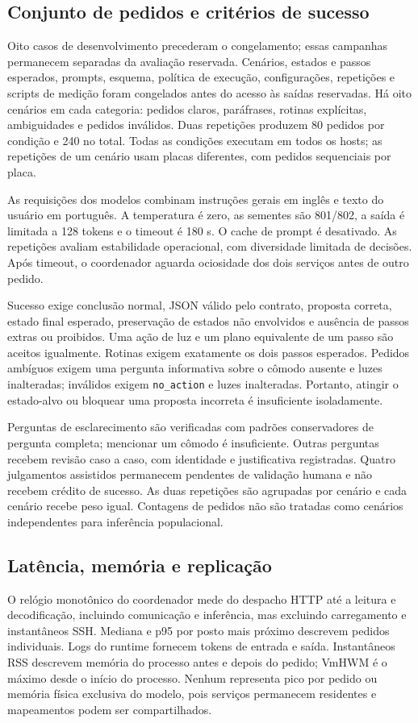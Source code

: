 \documentclass[letterpaper,conference]{IEEEtran}
\begin{document}
\subsection{Conjunto de pedidos e critérios de sucesso}
Oito casos de desenvolvimento precederam o congelamento; essas campanhas permanecem separadas da avaliação reservada. Cenários, estados e passos esperados, prompts, esquema, política de execução, configurações, repetições e scripts de medição foram congelados antes do acesso às saídas reservadas. Há oito cenários em cada categoria: pedidos claros, paráfrases, rotinas explícitas, ambiguidades e pedidos inválidos. Duas repetições produzem 80 pedidos por condição e 240 no total. Todas as condições executam em todos os hosts; as repetições de um cenário usam placas diferentes, com pedidos sequenciais por placa.

As requisições dos modelos combinam instruções gerais em inglês e texto do usuário em português. A temperatura é zero, as sementes são 801/802, a saída é limitada a 128 tokens e o timeout é 180 s. O cache de prompt é desativado. As repetições avaliam estabilidade operacional, com diversidade limitada de decisões. Após timeout, o coordenador aguarda ociosidade dos dois serviços antes de outro pedido.

Sucesso exige conclusão normal, JSON válido pelo contrato, proposta correta, estado final esperado, preservação de estados não envolvidos e ausência de passos extras ou proibidos. Uma ação de luz e um plano equivalente de um passo são aceitos igualmente. Rotinas exigem exatamente os dois passos esperados. Pedidos ambíguos exigem uma pergunta informativa sobre o cômodo ausente e luzes inalteradas; inválidos exigem \texttt{no\_action} e luzes inalteradas. Portanto, atingir o estado-alvo ou bloquear uma proposta incorreta é insuficiente isoladamente.

Perguntas de esclarecimento são verificadas com padrões conservadores de pergunta completa; mencionar um cômodo é insuficiente. Outras perguntas recebem revisão caso a caso, com identidade e justificativa registradas. Quatro julgamentos assistidos permanecem pendentes de validação humana e não recebem crédito de sucesso. As duas repetições são agrupadas por cenário e cada cenário recebe peso igual. Contagens de pedidos não são tratadas como cenários independentes para inferência populacional.

\subsection{Latência, memória e replicação}
O relógio monotônico do coordenador mede do despacho HTTP até a leitura e decodificação, incluindo comunicação e inferência, mas excluindo carregamento e instantâneos SSH. Mediana e p95 por posto mais próximo descrevem pedidos individuais. Logs do runtime fornecem tokens de entrada e saída. Instantâneos RSS descrevem memória do processo antes e depois do pedido; VmHWM é o máximo desde o início do processo. Nenhum representa pico por pedido ou memória física exclusiva do modelo, pois serviços permanecem residentes e mapeamentos podem ser compartilhados.
\end{document}
